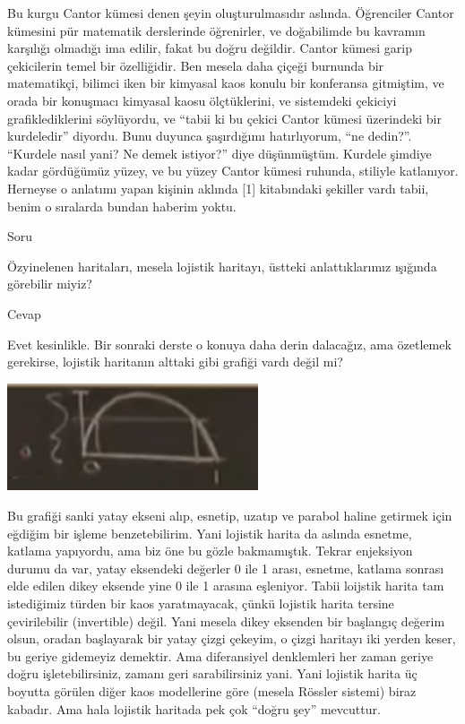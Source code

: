 \documentclass[12pt,fleqn]{article}\usepackage{../../common}
\begin{document}
Bu kurgu Cantor kümesi denen şeyin oluşturulmasıdır aslında. Öğrenciler
Cantor kümesini pür matematik derslerinde öğrenirler, ve doğabilimde bu
kavramın karşılığı olmadığı ima edilir, fakat bu doğru değildir. Cantor
kümesi garip çekicilerin temel bir özelliğidir. Ben mesela daha çiçeği
burnunda bir matematikçi, bilimci iken bir kimyasal kaos konulu bir
konferansa gitmiştim, ve orada bir konuşmacı kimyasal kaosu ölçtüklerini,
ve sistemdeki çekiciyi grafiklediklerini söylüyordu, ve ``tabii ki bu
çekici Cantor kümesi üzerindeki bir kurdeledir'' diyordu. Bunu duyunca
şaşırdığımı hatırlıyorum, ``ne dedin?''. ``Kurdele nasıl yani? Ne demek
istiyor?'' diye düşünmüştüm.  Kurdele şimdiye kadar gördüğümüz yüzey, ve bu
yüzey Cantor kümesi ruhunda, stiliyle katlanıyor. Herneyse o anlatımı yapan
kişinin aklında [1] kitabındaki şekiller vardı tabii, benim o sıralarda
bundan haberim yoktu.

Soru

Özyinelenen haritaları, mesela lojistik haritayı, üstteki anlattıklarımız
ışığında görebilir miyiz?

Cevap

Evet kesinlikle. Bir sonraki derste o konuya daha derin dalacağız, ama
özetlemek gerekirse, lojistik haritanın alttaki gibi grafiği vardı değil
mi?

\includegraphics[width=20em]{23_26.png}

Bu grafiği sanki yatay ekseni alıp, esnetip, uzatıp ve parabol haline
getirmek için eğdiğim bir işleme benzetebilirim. Yani lojistik harita da
aslında esnetme, katlama yapıyordu, ama biz öne bu gözle
bakmamıştık. Tekrar enjeksiyon durumu da var, yatay eksendeki değerler 0
ile 1 arası, esnetme, katlama sonrası elde edilen dikey eksende yine 0 ile
1 arasına eşleniyor. Tabii loijstik harita tam istediğimiz türden bir kaos
yaratmayacak, çünkü lojistik harita tersine çevirilebilir (invertible)
değil. Yani mesela dikey eksenden bir başlangıç değerim olsun, oradan
başlayarak bir yatay çizgi çekeyim, o çizgi haritayı iki yerden keser, bu
geriye gidemeyiz demektir. Ama diferansiyel denklemleri her zaman geriye
doğru işletebilirsiniz, zamanı geri sarabilirsiniz yani. Yani lojistik
harita üç boyutta görülen diğer kaos modellerine göre (mesela Rössler
sistemi) biraz kabadır. Ama hala lojistik haritada pek çok ``doğru şey''
mevcuttur.
\end{document}
